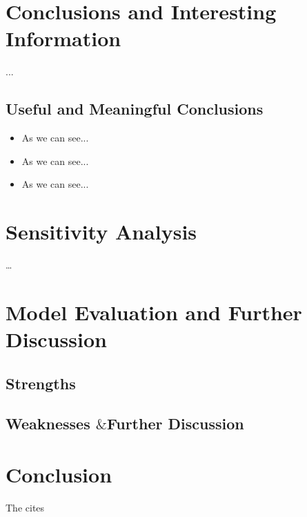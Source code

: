 \section{Conclusions and Interesting Information}
...
\subsection{Useful and Meaningful Conclusions}
\begin{itemize}
    \setlength{\parsep}{0ex} %
    \setlength{\topsep}{2ex} %
    \setlength{\itemsep}{1ex} %
    \item As we can see...
    \item As we can see...
    \item As we can see...
\end{itemize}

\section{Sensitivity Analysis}
\dots

\section{Model Evaluation and Further Discussion}
\subsection{Strengths}

\subsection{Weaknesses \texorpdfstring{$\&$} FFurther Discussion}

\section{Conclusion}
The cites